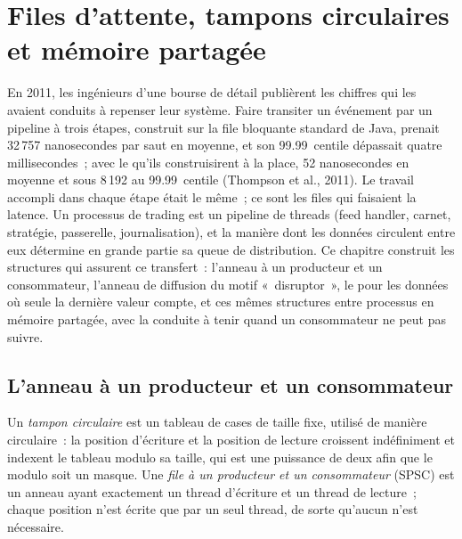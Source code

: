 \chapter{Files d'attente, tampons circulaires et mémoire partagée}\label{ch:ll:queues-ring-buffers-and-shared-memory}

En 2011, les ingénieurs d'une bourse de détail publièrent les chiffres qui les avaient conduits à repenser leur système. Faire transiter un
événement par un pipeline à trois étapes, construit sur la file bloquante standard de Java, prenait 32\,757 nanosecondes par saut
en moyenne, et son 99.99~centile dépassait quatre millisecondes~; avec le  qu'ils construisirent à la place, 52
nanosecondes en moyenne et sous 8\,192 au 99.99~centile (Thompson et al., 2011). Le travail accompli dans chaque étape était le
même~; ce sont les files qui faisaient la latence. Un processus de trading est un pipeline de threads (feed handler, carnet, stratégie, passerelle,
journalisation), et la manière dont les données circulent entre eux détermine en grande partie sa queue de distribution. Ce chapitre construit les structures qui assurent ce transfert~:
l'anneau à un producteur et un consommateur, l'anneau de diffusion du motif «~disruptor~», le  pour les données où seule
la dernière valeur compte, et ces mêmes structures entre processus en mémoire partagée, avec la conduite à tenir quand un
consommateur ne peut pas suivre.

\section{L'anneau à un producteur et un consommateur}

\begin{definition}\label{def:ll:queues-ring-buffers-and-shared-memory:ring}
Un \emph{tampon circulaire} est un tableau de cases de taille fixe, utilisé de manière circulaire~: la position d'écriture et la position de lecture
croissent indéfiniment et indexent le tableau modulo sa taille, qui est une puissance de deux afin que le modulo soit un masque. Une \emph{file à un producteur et un
consommateur} (SPSC) est un anneau ayant exactement un thread d'écriture et un
thread de lecture~; chaque position n'est écrite que par un seul thread, de sorte qu'aucun  n'est nécessaire.
\end{definition}

